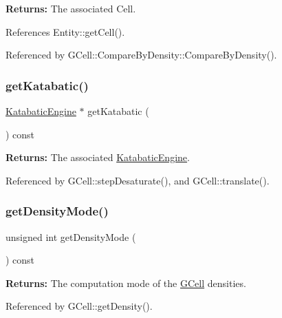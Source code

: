 {\bfseries Returns\+:} The associated Cell. 

References Entity\+::get\+Cell().



Referenced by G\+Cell\+::\+Compare\+By\+Density\+::\+Compare\+By\+Density().

\mbox{\label{classKatabatic_1_1GCellGrid_a0234fdabe7682546f1201bccd0b5cacf}} 
\subsubsection{\texorpdfstring{get\+Katabatic()}{getKatabatic()}}
{\footnotesize\ttfamily \hyperlink{classKatabatic_1_1KatabaticEngine}{Katabatic\+Engine} $\ast$ get\+Katabatic (\begin{DoxyParamCaption}{ }\end{DoxyParamCaption}) const\hspace{0.3cm}{\ttfamily [inline]}}

{\bfseries Returns\+:} The associated \hyperlink{classKatabatic_1_1KatabaticEngine}{Katabatic\+Engine}. 

Referenced by G\+Cell\+::step\+Desaturate(), and G\+Cell\+::translate().

\mbox{\label{classKatabatic_1_1GCellGrid_af1171855a3e928cace78d1534a8d0629}} 
\subsubsection{\texorpdfstring{get\+Density\+Mode()}{getDensityMode()}}
{\footnotesize\ttfamily unsigned int get\+Density\+Mode (\begin{DoxyParamCaption}{ }\end{DoxyParamCaption}) const\hspace{0.3cm}{\ttfamily [inline]}}

{\bfseries Returns\+:} The computation mode of the \hyperlink{classKatabatic_1_1GCell}{G\+Cell} densities. 

Referenced by G\+Cell\+::get\+Density().

